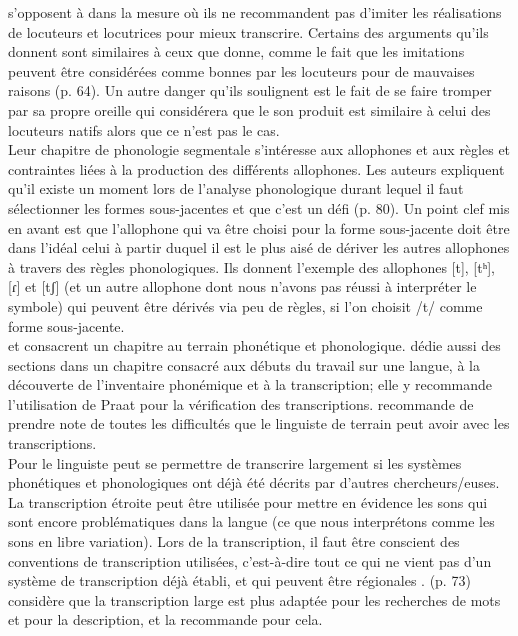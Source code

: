 \citeauthor{vauxIntroductionLinguisticField2003} s'opposent à \textcite{ladefogedPhoneticDataAnalysis2003} dans la mesure où ils ne recommandent pas d'imiter les réalisations de locuteurs et locutrices pour mieux transcrire. Certains des arguments qu'ils donnent sont similaires à ceux que \citeauthor{ladefogedPhoneticDataAnalysis2003} donne, comme le fait que les imitations peuvent être considérées comme bonnes par les locuteurs pour de mauvaises raisons (p. 64). Un autre danger qu'ils soulignent est le fait de se faire tromper par sa propre oreille qui considérera que le son produit est similaire à celui des locuteurs natifs alors que ce n'est pas le cas.\\

Leur chapitre de phonologie segmentale s'intéresse aux allophones et aux règles et contraintes liées à la production des différents allophones. Les auteurs expliquent qu'il existe un moment lors de l'analyse phonologique durant lequel il faut sélectionner les formes sous-jacentes et que c'est un défi  (p. 80). Un point clef mis en avant est que l'allophone qui va être choisi pour la forme sous-jacente doit être dans l'idéal celui à partir duquel il est le plus aisé de dériver les autres allophones à travers des règles phonologiques. Ils donnent l'exemple des allophones [t], [tʰ], [ɾ] et [tʃ] (et un autre allophone dont nous n'avons pas réussi à interpréter le symbole) qui peuvent être dérivés via peu de règles, si l'on choisit /t/ comme forme sous-jacente.\\


\textcite{chelliahHandbookDescriptiveLinguistic2011} et \textcite{bowernLinguisticFieldwork2015} consacrent un chapitre au terrain phonétique et phonologique. \citeauthor{bowernLinguisticFieldwork2015} dédie aussi des sections dans un chapitre consacré aux débuts du travail sur une langue, à la découverte de l'inventaire phonémique et à la transcription; elle y recommande l'utilisation de Praat \parencite{boersmaPRAATSystemDoing2001} pour la vérification des transcriptions. \citeauthor[41]{bowernLinguisticFieldwork2015} recommande de prendre note de toutes les difficultés que le linguiste de terrain peut avoir avec les transcriptions. \\


Pour \textcite[256]{chelliahHandbookDescriptiveLinguistic2011} le linguiste peut se permettre de transcrire largement si les systèmes phonétiques et phonologiques ont déjà été décrits par d'autres chercheurs/euses. La transcription étroite peut être utilisée pour mettre en évidence les sons qui sont encore problématiques dans la langue (ce que nous interprétons comme les sons en libre variation). Lors de la transcription, il faut être conscient des conventions de transcription utilisées, c'est-à-dire tout ce qui ne vient pas d'un système de transcription déjà établi, et qui peuvent être régionales \parencite[43]{bowernLinguisticFieldwork2015}. \citeauthor{bowernLinguisticFieldwork2015} (p. 73) considère que la transcription large est plus adaptée pour les recherches de mots et pour la description, et la recommande pour cela.

